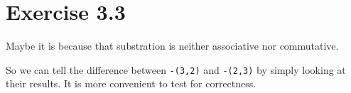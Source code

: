 \section*{Exercise 3.3}

Maybe it is because that substration is neither associative nor commutative.

So we can tell the difference between \texttt{-(3,2)} and \texttt{-(2,3)} by simply
looking at their results. It is more convenient to test for correctness.
